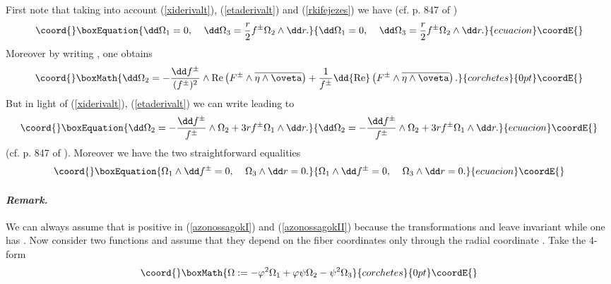 \documentclass[a4paper,12pt,draft]{article}
\newenvironment{remark}{\paragraph{\it Remark.}}{\vskip0.4cm}
\begin{document}
First note that taking into account (\ref{xiderivalt}), 
(\ref{etaderivalt}) and (\ref{rkifejezes}) we have (cf. p. 847 of
\cite{bry-sal})
\begin{equation}\coord{}\boxEquation{
\dd\Omega_1=0,\:\:\:\:\:\dd\Omega_3 ={r\over 2}f^\pm\Omega_2\wedge\dd r. 
\label{azonossagokI}
}{
\dd\Omega_1=0,\:\:\:\:\:\dd\Omega_3 ={r\over 2}f^\pm\Omega_2\wedge\dd r. 
}{ecuacion}\coordE{}\end{equation}
Moreover by writing \coordHE{}, one obtains
\[\coord{}\boxMath{\dd\Omega_2= -{\dd f^\pm\over (f^\pm)^2}\wedge{\rm
Re}\left( F^\pm\wedge\overline{\eta\wedge\oveta}\right)+{1\over
f^\pm}\dd{\rm
Re}\left( F^\pm\wedge\overline{\eta\wedge\oveta}\right) .}{corchetes}{0pt}\coordE{}\]
But in light of (\ref{xiderivalt}), (\ref{etaderivalt}) we can
write \coordHE{}
leading to 
\begin{equation}\coord{}\boxEquation{
\dd\Omega_2=-{\dd f^\pm\over f^\pm}\wedge\Omega_2 +
3rf^\pm\Omega_1\wedge\dd r.
\label{azonossagokII}
}{
\dd\Omega_2=-{\dd f^\pm\over f^\pm}\wedge\Omega_2 +
3rf^\pm\Omega_1\wedge\dd r.
}{ecuacion}\coordE{}\end{equation}
(cf. p. 847 of \cite{bry-sal}). Moreover we have the two straightforward
equalities
\begin{equation}\coord{}\boxEquation{
\Omega_1\wedge\dd f^\pm =0,\:\:\:\:\:\Omega_3\wedge\dd r=0.
\label{azonossagokIII}
}{
\Omega_1\wedge\dd f^\pm =0,\:\:\:\:\:\Omega_3\wedge\dd r=0.
}{ecuacion}\coordE{}\end{equation}
\begin{remark}
We can always assume that \coordHE{} is positive
in (\ref{azonossagokI}) and (\ref{azonossagokII}) because the
transformations \myHighlight{$\xi\wedge\ovxi\mapsto
-\xi\wedge\ovxi$}\coordHE{} and \myHighlight{$\eta\wedge\oveta\mapsto -\eta\wedge\oveta$}\coordHE{} leave
\coordHE{} invariant while one has \coordHE{}. 
\end{remark} 
Now consider two functions \coordHE{} and
assume that they depend on the fiber coordinates \coordHE{} only through
the radial coordinate \coordHE{}. Take the 4-form
\[\coord{}\boxMath{\Omega :=-\varphi^2\Omega_1+\varphi\psi\Omega_2-\psi^2\Omega_3}{corchetes}{0pt}\coordE{}\]
\end{document}
